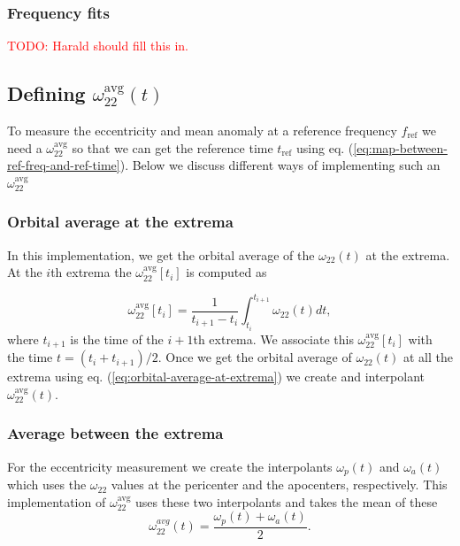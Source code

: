 \documentclass[aps,prd,amsmath,floats,floatfix, twocolumn,
superscriptaddress,nofootinbib,showpacs]{revtex4-1}
\newcommand{\red}{\textcolor{red}}
\newcommand{\TODO}[1]{\red{TODO: #1}}
\begin{document}
\subsubsection{Frequency fits}
\label{sec:frequenc-fits}

\TODO{Harald should fill this in.}

\subsection{Defining $\omega^{\text{avg}}_{22}(t)$}
\label{sec:definig-average-omega22}

To measure the eccentricity and mean anomaly at a reference frequency $f_{\text{ref}}$
we need a $\omega_{22}^{\text{avg}}$ so that we can get the reference
time $t_{\text{ref}}$ using
eq. (\ref{eq:map-between-ref-freq-and-ref-time}). Below we discuss
different ways of implementing such an $\omega_{22}^{\text{avg}}$

\subsubsection{Orbital average at the extrema}
\label{sec:orbital-average-at-the-extrema}
In this implementation, we get the orbital average of the
$\omega_{22}(t)$ at the extrema. At the $i$th extrema the
$\omega^{\text{avg}}_{22}[t_i]$ is computed as

\begin{equation}
  \label{eq:orbital-average-at-extrema}
  \omega^{\text{avg}}_{22}[t_i] = \frac{1}{t_{i+1} -
    t_{i}}\int_{t_{i}}^{t_{i+1}}\omega_{22}(t) dt,
\end{equation}
where $t_{i+1}$ is the time of the $i+1$th extrema. We associate this
$\omega_{22}^{\text{avg}}[t_{i}]$ with the time $t = (t_i +
t_{i+1})/2$. Once we get the orbital average of $\omega_{22}(t)$ at
all the extrema using eq. (\ref{eq:orbital-average-at-extrema}) we
create and interpolant $\omega_{22}^{\text{avg}}(t)$.

\subsubsection{Average between the extrema}
\label{sec:average-between-the-extrema}
For the eccentricity measurement we create the interpolants
$\omega_{p}(t)$ and $\omega_a(t)$ which uses the $\omega_{22}$ values
at the pericenter and the apocenters, respectively. This
implementation of $\omega_{22}^{\text{avg}}$ uses these two
interpolants and takes the mean of these
\begin{equation}
  \label{eq:average-between-extrema}
  \omega_{22}^{avg}(t) = \frac{\omega_{p}(t) + \omega_{a}(t)}{2}.
\end{equation}
\end{document}
